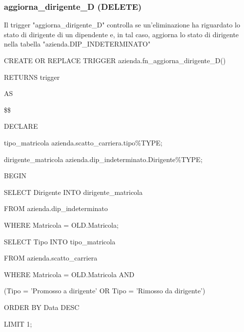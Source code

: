         \subsubsection{aggiorna\_dirigente\_D (DELETE)}
        Il trigger "aggiorna\_dirigente\_D" controlla se un'eliminazione ha riguardato lo stato di dirigente di un dipendente e, in tal caso, aggiorna lo stato di dirigente nella tabella "azienda.DIP\_INDETERMINATO"
        \ttfamily
            \begin{flushleft}
                \begin{description}
                    \item CREATE OR REPLACE TRIGGER azienda.fn\_aggiorna\_dirigente\_D()  
                    \item RETURNS trigger
                    \item AS
                    \item \$\$
                    \item DECLARE
                    \begin{description}
                        \item tipo\_matricola azienda.scatto\_carriera.tipo\%TYPE;
                        \item dirigente\_matricola azienda.dip\_indeterminato.Dirigente\%TYPE;
                    \end{description}
                    \item BEGIN 
                    \begin{description}
                        \item SELECT Dirigente INTO dirigente\_matricola 
                        \item FROM azienda.dip\_indeterminato
                        \item WHERE Matricola = OLD.Matricola;
                            
                        \vspace{0.5cm}

                        \item SELECT Tipo INTO tipo\_matricola 
                        \item FROM azienda.scatto\_carriera
                        \item WHERE Matricola = OLD.Matricola AND 
                        \item (Tipo = 'Promosso a dirigente' OR Tipo = 'Rimosso da dirigente')
                        \item ORDER BY Data DESC
                        \item LIMIT 1;


\end{description}
\end{description}
\end{flushleft}
